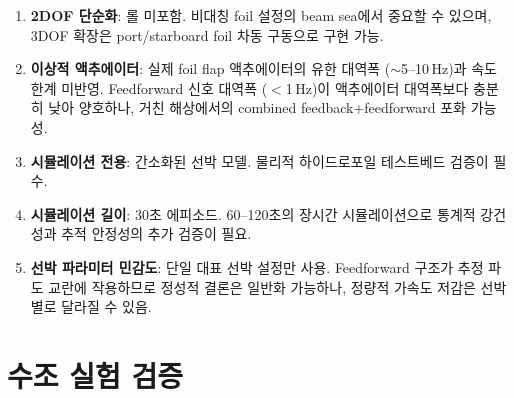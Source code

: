 \documentclass[11pt]{report}
\numberwithin{equation}{chapter}
\numberwithin{figure}{chapter}
\numberwithin{table}{chapter}
\begin{document}
\begin{enumerate}
  \item \textbf{2DOF 단순화}: 롤 미포함. 비대칭 foil 설정의 beam sea에서
        중요할 수 있으며, 3DOF 확장은 port/starboard foil 차동 구동으로 구현 가능.
  \item \textbf{이상적 액추에이터}: 실제 foil flap 액추에이터의 유한 대역폭
        ($\sim$5--10\,Hz)과 속도 한계 미반영.
        Feedforward 신호 대역폭 ($<$1\,Hz)이 액추에이터 대역폭보다 충분히 낮아
        양호하나, 거친 해상에서의 combined feedback+feedforward 포화 가능성.
  \item \textbf{시뮬레이션 전용}: 간소화된 선박 모델. 물리적 하이드로포일 테스트베드
        검증이 필수.
  \item \textbf{시뮬레이션 길이}: 30초 에피소드. 60--120초의 장시간 시뮬레이션으로
        통계적 강건성과 추적 안정성의 추가 검증이 필요.
  \item \textbf{선박 파라미터 민감도}: 단일 대표 선박 설정만 사용.
        Feedforward 구조가 추정 파도 교란에 작용하므로 정성적 결론은
        일반화 가능하나, 정량적 가속도 저감은 선박별로 달라질 수 있음.
\end{enumerate}

\chapter{수조 실험 검증}
\end{document}
